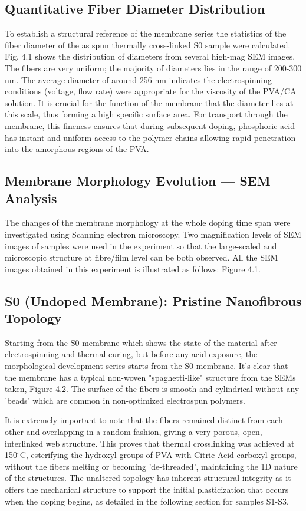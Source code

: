 \documentclass[12pt,a4paper]{report}
\begin{document}
\subsection{Quantitative Fiber Diameter Distribution}

To establish a structural reference of the membrane series the statistics of the fiber diameter of the as spun thermally cross-linked S0 sample were calculated. Fig. 4.1 shows the distribution of diameters from several high-mag SEM images. The fibers are very uniform; the majority of diameters lies in the range of 200-300 nm. The average diameter of around 256 nm indicates the electrospinning conditions (voltage, flow rate) were appropriate for the viscosity of the PVA/CA solution. It is crucial for the function of the membrane that the diameter lies at this scale, thus forming a high specific surface area. For transport through the membrane, this fineness ensures that during subsequent doping, phosphoric acid has instant and uniform access to the polymer chains allowing rapid penetration into the amorphous regions of the PVA.


\subsection{Membrane Morphology Evolution — SEM Analysis}
The changes of the membrane morphology at the whole doping time span were investigated using Scanning electron microscopy. Two magnification levels of SEM images of samples were used in the experiment so that the large-scaled and microscopic structure at fibre/film level can be both observed. All the SEM images obtained in this experiment is illustrated as follows: Figure 4.1.\cite{39}
\subsection{S0 (Undoped Membrane): Pristine Nanofibrous Topology}
Starting from the S0 membrane which shows the state of the material after electrospinning and thermal curing, but before any acid exposure, the morphological development series starts from the S0 membrane. It's clear that the membrane has a typical non-woven "spaghetti-like" structure from the SEMs taken, Figure 4.2. The surface of the fibers is smooth and cylindrical without any 'beads' which are common in non-optimized electrospun polymers.

It is extremely important to note that the fibers remained distinct from each other and overlapping in a random fashion, giving a very porous, open, interlinked web structure. This proves that thermal crosslinking was achieved at 150$^\circ$C, esterifying the hydroxyl groups of PVA with Citric Acid carboxyl groups, without the fibers melting or becoming 'de-threaded', maintaining the 1D nature of the structures. The unaltered topology has inherent structural integrity as it offers the mechanical structure to support the initial plasticization that occurs when the doping begins, as detailed in the following section for samples S1-S3.
\end{document}
